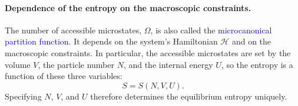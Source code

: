 \paragraph{Dependence of the entropy on the macroscopic constraints.}
The number of accessible microstates, $\Omega$, is also called the
\textcolor{blue}{microcanonical partition function}. It depends on the
system's Hamiltonian $\mathcal{H}$ and on the macroscopic constraints. In
particular, the accessible microstates are set by the volume $V$, the
particle number $N$, and the internal energy $U$, so the entropy is a
function of these three variables:
\begin{equation}
    \boxed{S = S(N,V,U).}
\end{equation}
Specifying $N$, $V$, and $U$ therefore determines the equilibrium entropy
uniquely.